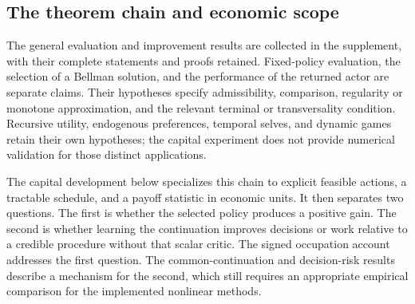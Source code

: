 \subsection{The theorem chain and economic scope}\label{sec:r16theoryguide}
The general evaluation and improvement results are collected in the supplement, with their complete statements and proofs retained. Fixed-policy evaluation, the selection of a Bellman solution, and the performance of the returned actor are separate claims. Their hypotheses specify admissibility, comparison, regularity or monotone approximation, and the relevant terminal or transversality condition. Recursive utility, endogenous preferences, temporal selves, and dynamic games retain their own hypotheses; the capital experiment does not provide numerical validation for those distinct applications.

The capital development below specializes this chain to explicit feasible actions, a tractable schedule, and a payoff statistic in economic units. It then separates two questions. The first is whether the selected policy produces a positive gain. The second is whether learning the continuation improves decisions or work relative to a credible procedure without that scalar critic. The signed occupation account addresses the first question. The common-continuation and decision-risk results describe a mechanism for the second, which still requires an appropriate empirical comparison for the implemented nonlinear methods.
